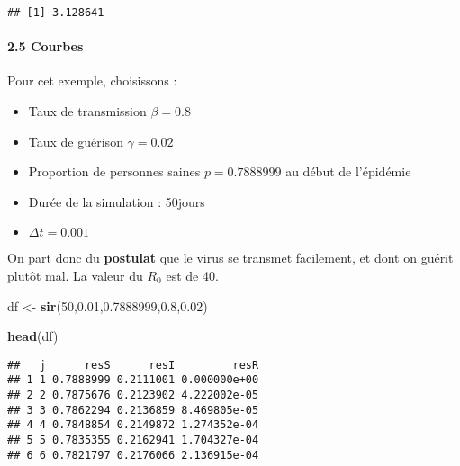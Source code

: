 \documentclass[
]{article}
\newenvironment{Shaded}{\begin{snugshade}}{\end{snugshade}}
\newcommand{\DecValTok}[1]{\textcolor[rgb]{0.00,0.00,0.81}{#1}}
\newcommand{\FloatTok}[1]{\textcolor[rgb]{0.00,0.00,0.81}{#1}}
\newcommand{\KeywordTok}[1]{\textcolor[rgb]{0.13,0.29,0.53}{\textbf{#1}}}
\newcommand{\NormalTok}[1]{#1}
\newcommand{\StringTok}[1]{\textcolor[rgb]{0.31,0.60,0.02}{#1}}
\providecommand{\tightlist}{%
  \setlength{\itemsep}{0pt}\setlength{\parskip}{0pt}}
\begin{document}
\begin{verbatim}
## [1] 3.128641
\end{verbatim}

\hypertarget{courbes}{%
\paragraph{2.5 Courbes}\label{courbes}}

Pour cet exemple, choisissons :

\begin{itemize}
\tightlist
\item
  Taux de transmission \(\beta = 0.8\)
\item
  Taux de guérison \(\gamma=0.02\)
\item
  Proportion de personnes saines \(p=0.7888999\) au début de l'épidémie
\item
  Durée de la simulation : 50jours
\item
  \(\Delta t= 0.001\)
\end{itemize}

On part donc du \textbf{postulat} que le virus se transmet facilement,
et dont on guérit plutôt mal. La valeur du \(R_0\) est de 40.

\begin{Shaded}
\begin{Highlighting}[]
\NormalTok{df <-}\StringTok{ }\KeywordTok{sir}\NormalTok{(}\DecValTok{50}\NormalTok{,}\FloatTok{0.01}\NormalTok{,}\FloatTok{0.7888999}\NormalTok{,}\FloatTok{0.8}\NormalTok{,}\FloatTok{0.02}\NormalTok{)}

\KeywordTok{head}\NormalTok{(df)}
\end{Highlighting}
\end{Shaded}

\begin{verbatim}
##   j      resS      resI         resR
## 1 1 0.7888999 0.2111001 0.000000e+00
## 2 2 0.7875676 0.2123902 4.222002e-05
## 3 3 0.7862294 0.2136859 8.469805e-05
## 4 4 0.7848854 0.2149872 1.274352e-04
## 5 5 0.7835355 0.2162941 1.704327e-04
## 6 6 0.7821797 0.2176066 2.136915e-04
\end{verbatim}
\end{document}

